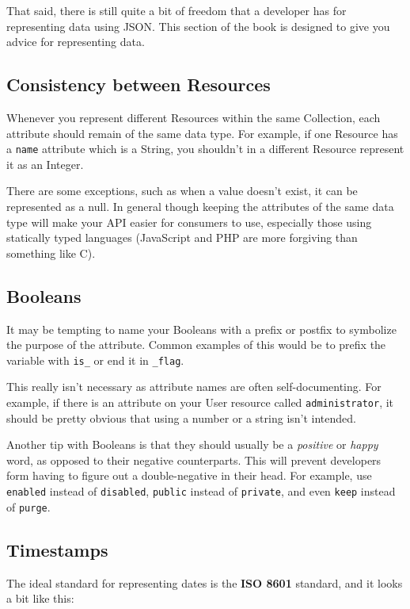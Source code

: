 \documentclass{book}
\begin{document}
That said, there is still quite a bit of freedom that a developer has for representing data using JSON. This section of the book is designed to give you advice for representing data.

\subsection{Consistency between Resources}

Whenever you represent different Resources within the same Collection, each attribute should remain of the same data type. For example, if one Resource has a \texttt{name} attribute which is a String, you shouldn't in a different Resource represent it as an Integer.

There are some exceptions, such as when a value doesn't exist, it can be represented as a null. In general though keeping the attributes of the same data type will make your API easier for consumers to use, especially those using statically typed languages (JavaScript and PHP are more forgiving than something like C).

\subsection{Booleans}

It may be tempting to name your Booleans with a prefix or postfix to symbolize the purpose of the attribute. Common examples of this would be to prefix the variable with \texttt{is\_} or end it in \texttt{\_flag}.

This really isn't necessary as attribute names are often self-documenting. For example, if there is an attribute on your User resource called \texttt{administrator}, it should be pretty obvious that using a number or a string isn't intended.

Another tip with Booleans is that they should usually be a \emph{positive} or \emph{happy} word, as opposed to their negative counterparts. This will prevent developers form having to figure out a double-negative in their head. For example, use \texttt{enabled} instead of \texttt{disabled}, \texttt{public} instead of \texttt{private}, and even \texttt{keep} instead of \texttt{purge}.

\subsection{Timestamps}

The ideal standard for representing dates is the \textbf{ISO 8601} \cite{ISO8601} standard, and it looks a bit like this:
\end{document}
